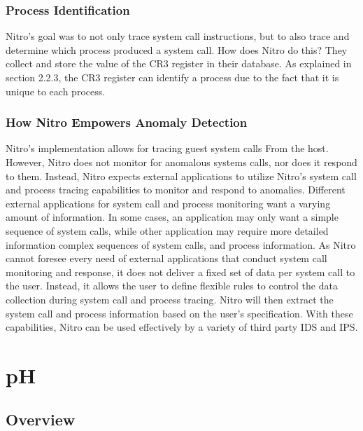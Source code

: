 \documentclass{report}
\begin{document}
\begin{spacing}{1.5}
\subsubsection{Process Identification}

{\large
\leavevmode\newline
Nitro's goal was to not only trace system call instructions, but to also trace and determine which process produced a system call. How does Nitro do this? They collect and store the value of the CR3 register in their database. As explained in section 2.2.3, the CR3 register can identify a process due to the fact that it is unique to each process.  
\leavevmode\newline
}


\subsubsection{How Nitro Empowers Anomaly Detection}

{\large
\leavevmode\newline
Nitro's implementation allows for tracing guest system calls From the host. However, Nitro does not monitor for anomalous systems calls, nor does it respond to them. Instead, Nitro expects external applications to utilize Nitro's system call and process tracing capabilities to monitor and respond to anomalies. Different external applications for system call and process monitoring want a varying amount of information. In some cases, an application may only want a simple sequence of system calls, while other application may require more detailed information complex sequences of system calls, and process information. As Nitro cannot foresee every need of external applications that conduct system call monitoring and response, it does not deliver a fixed set of data per system call to the user. Instead, it allows the user to define flexible rules to control the data collection during system call and process tracing. Nitro will then extract the system call and process information based on the user's specification. With these capabilities, Nitro can be used effectively by a variety of third party IDS and IPS.
\newline
}





\section{pH}

\subsection{Overview}


\end{spacing}
\end{document}
